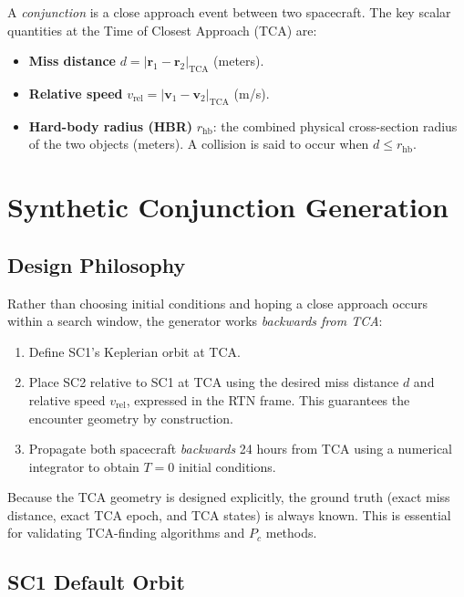 \documentclass[11pt]{article}
\begin{document}
A \emph{conjunction} is a close approach event between two spacecraft.  The key
scalar quantities at the Time of Closest Approach (TCA) are:
\begin{itemize}
  \item \textbf{Miss distance} $d = |\mathbf{r}_1 - \mathbf{r}_2|_{\text{TCA}}$
        (meters).
  \item \textbf{Relative speed} $v_\text{rel} = |\mathbf{v}_1 - \mathbf{v}_2|_{\text{TCA}}$
        (m/s).
  \item \textbf{Hard-body radius (HBR)} $r_\text{hb}$: the combined physical
        cross-section radius of the two objects (meters).  A collision is said
        to occur when $d \le r_\text{hb}$.
\end{itemize}

\section{Synthetic Conjunction Generation}
\label{sec:conjunction}

\subsection{Design Philosophy}

Rather than choosing initial conditions and hoping a close approach occurs
within a search window, the generator works \emph{backwards from TCA}:

\begin{enumerate}
  \item Define SC1's Keplerian orbit at TCA.
  \item Place SC2 relative to SC1 at TCA using the desired miss distance
        $d$ and relative speed $v_\text{rel}$, expressed in the RTN frame.
        This guarantees the encounter geometry by construction.
  \item Propagate both spacecraft \emph{backwards} 24 hours from TCA using
        a numerical integrator to obtain $T{=}0$ initial conditions.
\end{enumerate}

Because the TCA geometry is designed explicitly, the ground truth
(exact miss distance, exact TCA epoch, and TCA states) is always known.  This
is essential for validating TCA-finding algorithms and $P_c$ methods.

\subsection{SC1 Default Orbit}
\end{document}

